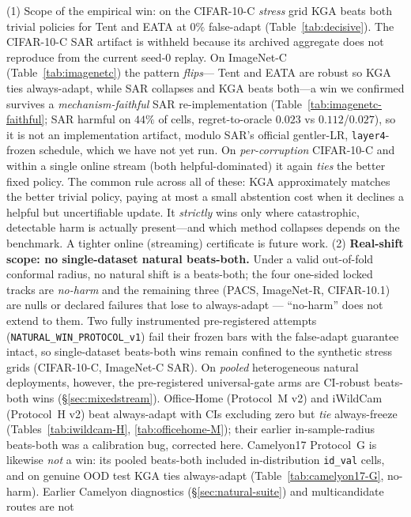 \documentclass[conference]{IEEEtran}
\theoremstyle{plain}
\theoremstyle{definition}
\begin{document}
(1) Scope of the empirical win: on the CIFAR-10-C \emph{stress} grid \textsc{KGA} beats both
trivial policies for Tent and EATA at $0\%$ false-adapt (Table~\ref{tab:decisive}). The
CIFAR-10-C SAR artifact is withheld because its archived
aggregate does not reproduce from the current seed-0 replay. On ImageNet-C
(Table~\ref{tab:imagenetc}) the pattern \emph{flips}---
Tent and EATA are robust so \textsc{KGA} ties always-adapt, while SAR collapses and \textsc{KGA}
beats both---a win we confirmed survives a \emph{mechanism-faithful} SAR re-implementation
(Table~\ref{tab:imagenetc-faithful}; SAR harmful on $44\%$ of cells, regret-to-oracle $0.023$ vs
$0.112$/$0.027$), so it is not an implementation artifact, modulo SAR's official gentler-LR,
\texttt{layer4}-frozen schedule, which we have not yet run. On \emph{per-corruption} CIFAR-10-C and within a single online stream (both
helpful-dominated) it again \emph{ties} the better fixed policy. The common rule across all of
these: \textsc{KGA} approximately matches the better trivial policy, paying at most a small
abstention cost when it declines a helpful but uncertifiable update. It \emph{strictly} wins only
where catastrophic, detectable harm is actually present---and which method collapses depends on the
benchmark. A tighter online (streaming) certificate is future work.
(2) \textbf{Real-shift scope: no single-dataset natural beats-both.} Under a valid out-of-fold
conformal radius, no natural shift is a beats-both; the four one-sided locked tracks are
\emph{no-harm} and the remaining three (PACS, ImageNet-R, CIFAR-10.1) are nulls or declared
failures that lose to always-adapt --- ``no-harm'' does not extend to them. Two fully instrumented
pre-registered attempts (\texttt{NATURAL\_WIN\_PROTOCOL\_v1}) fail their frozen bars with the
false-adapt guarantee intact, so single-dataset beats-both wins remain confined to the synthetic
stress grids (CIFAR-10-C, ImageNet-C SAR). On \emph{pooled} heterogeneous natural deployments,
however, the pre-registered universal-gate arms are CI-robust beats-both wins
(\S\ref{sec:mixedstream}). Office-Home (Protocol~M v2) and
iWildCam (Protocol~H v2) beat always-adapt with CIs excluding zero but \emph{tie} always-freeze
(Tables~\ref{tab:iwildcam-H}, \ref{tab:officehome-M}); their earlier in-sample-radius beats-both was
a calibration bug, corrected here. Camelyon17 Protocol~G is likewise \emph{not} a win: its pooled
beats-both included in-distribution \texttt{id\_val} cells, and on genuine OOD test \textsc{KGA}
ties always-adapt (Table~\ref{tab:camelyon17-G}, no-harm).
Earlier Camelyon diagnostics (\S\ref{sec:natural-suite}) and multicandidate routes are not
\end{document}
